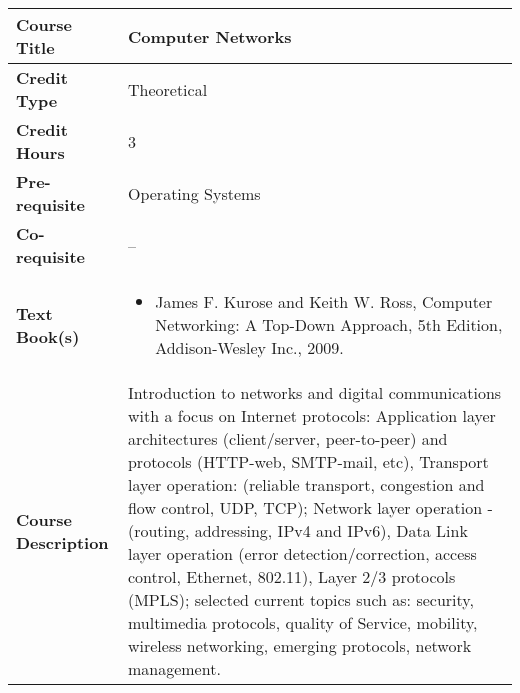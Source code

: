 \documentclass[11pt]{article}
\begin{document}
\begin{table}[h!]
\begin{tabular}{|l|l|}
\hline
\textbf{Course Title}       &   Computer Networks\\ \hline
\textbf{Credit Type}        &   Theoretical \\ \hline
\textbf{Credit Hours}       & 3 \\ \hline
\textbf{Pre-requisite}       &  Operating Systems \\ \hline
\textbf{Co-requisite}       &  -- \\ \hline
\textbf{Text Book(s)}       & \begin{minipage}{.70\textwidth}
\begin{itemize} \itemsep-0.4em
	\vspace{3mm}
	\item James F. Kurose and Keith W. Ross, Computer Networking: A Top-Down Approach, 5th Edition, Addison-Wesley Inc., 2009.
	\vspace{3mm}
\end{itemize}
\end{minipage}\\ \hline
\textbf{Course Description} & \begin{minipage}{.70\textwidth}
\vspace{3mm}
Introduction to networks and digital communications with a focus on Internet protocols: Application layer architectures (client/server, peer-to-peer) and protocols (HTTP-web, SMTP-mail, etc), Transport layer operation: (reliable transport, congestion and flow control, UDP, TCP); Network layer operation - (routing, addressing, IPv4 and IPv6), Data Link layer operation (error detection/correction, access control, Ethernet, 802.11), Layer 2/3 protocols (MPLS); selected current topics such as: security, multimedia protocols, quality of Service, mobility, wireless networking, emerging protocols, network management.
\vspace{3mm}
\end{minipage} \\ \hline
\end{tabular}
\end{table}
\end{document}
